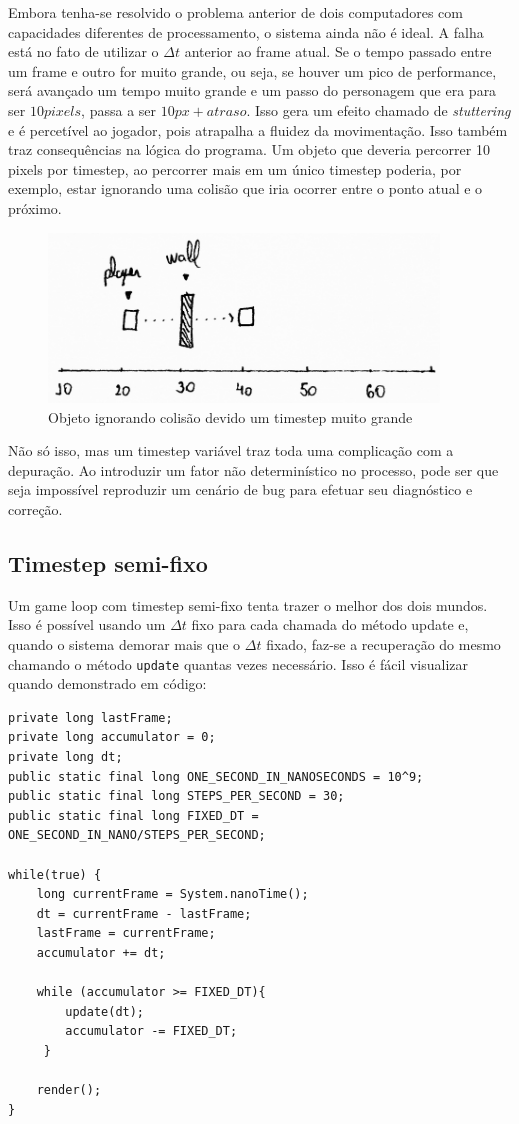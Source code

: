 \documentclass[12pt, 
openright, 
oneside, 
a4paper,    
brazil]{facom-ufu-abntex2}
\begin{document}
Embora tenha-se resolvido o problema anterior de dois computadores com capacidades diferentes de processamento, o sistema ainda não é ideal. A falha está no fato de utilizar o $\Delta t$ anterior ao frame atual. Se o tempo passado entre um frame e outro for muito grande, ou seja, se houver um pico de performance, será avançado um tempo muito grande e um passo do personagem que era para ser $10 pixels$, passa a ser $10px + atraso$. Isso gera um efeito chamado de \textit{stuttering} e é percetível ao jogador, pois atrapalha a fluidez da movimentação. Isso também traz consequências na lógica do programa. Um objeto que deveria percorrer 10 pixels por timestep, ao percorrer mais em um único timestep poderia, por exemplo, estar ignorando uma colisão que iria ocorrer entre o ponto atual e o próximo.
\begin{figure}[H]
	\centering
	\includegraphics[width=28em]{imagens/ilu4_small.png}
	\caption{Objeto ignorando colisão devido um timestep muito grande}
\end{figure}
 Não só isso, mas um timestep variável traz toda uma complicação com a depuração. Ao introduzir um fator não determinístico no processo, pode ser que seja impossível reproduzir um cenário de bug para efetuar seu diagnóstico e correção. 

\subsection{Timestep semi-fixo}
Um game loop com timestep semi-fixo tenta trazer o melhor dos dois mundos. Isso é possível usando um $\Delta t$ fixo para cada chamada do método update e, quando o sistema demorar mais que o $\Delta t$ fixado, faz-se a recuperação do mesmo chamando o método \texttt{update} quantas vezes necessário.
Isso é fácil visualizar quando demonstrado em código:

\begin{lstlisting}[caption={Game Loop com timestep semi-fixo}]
private long lastFrame;
private long accumulator = 0;
private long dt;
public static final long ONE_SECOND_IN_NANOSECONDS = 10^9;
public static final long STEPS_PER_SECOND = 30;
public static final long FIXED_DT = ONE_SECOND_IN_NANO/STEPS_PER_SECOND;
			
while(true) {
	long currentFrame = System.nanoTime(); 
	dt = currentFrame - lastFrame;
	lastFrame = currentFrame;
	accumulator += dt;
	
	while (accumulator >= FIXED_DT){
    	update(dt);
    	accumulator -= FIXED_DT;
 	 }
 			 
	render();
}
\end{lstlisting}
\end{document}
